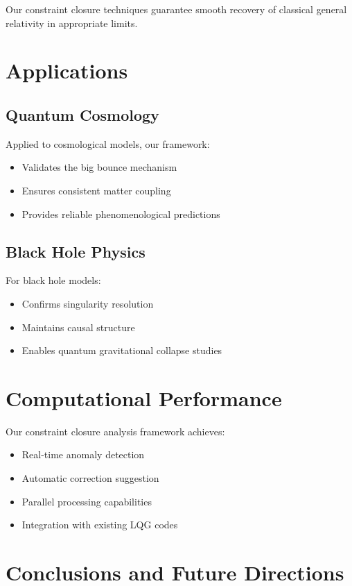 \documentclass[11pt]{article}
\begin{document}
Our constraint closure techniques guarantee smooth recovery of classical general relativity in appropriate limits.

\section{Applications}

\subsection{Quantum Cosmology}

Applied to cosmological models, our framework:
\begin{itemize}
\item Validates the big bounce mechanism
\item Ensures consistent matter coupling
\item Provides reliable phenomenological predictions
\end{itemize}

\subsection{Black Hole Physics}

For black hole models:
\begin{itemize}
\item Confirms singularity resolution
\item Maintains causal structure
\item Enables quantum gravitational collapse studies
\end{itemize}

\section{Computational Performance}

Our constraint closure analysis framework achieves:
\begin{itemize}
\item Real-time anomaly detection
\item Automatic correction suggestion
\item Parallel processing capabilities
\item Integration with existing LQG codes
\end{itemize}

\section{Conclusions and Future Directions}
\end{document}
